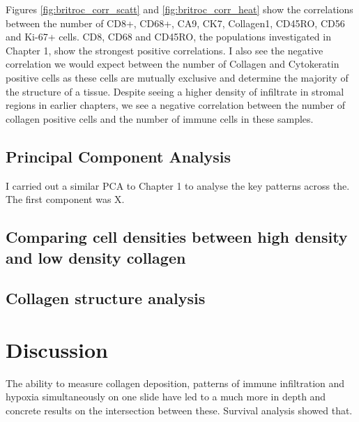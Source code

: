 Figures \ref{fig:britroc_corr_scatt} and \ref{fig:britroc_corr_heat} show the correlations between the number of CD8+, CD68+, CA9, CK7, Collagen1, CD45RO, CD56 and Ki-67+ cells. CD8, CD68 and CD45RO, the populations investigated in Chapter 1, show the strongest positive correlations. I also see the negative correlation we would expect between the number of Collagen and Cytokeratin positive cells as these cells are mutually exclusive and determine the majority of the structure of a tissue. Despite seeing a higher density of infiltrate in stromal regions in earlier chapters, we see a negative correlation between the number of collagen positive cells and the number of immune cells in these samples.

\subsection{Principal Component Analysis}
I carried out a similar PCA to Chapter 1 to analyse the key patterns across the. The first component was X.

\subsection{Comparing cell densities between high density and low density collagen}

\subsection{Collagen structure analysis}

\section{Discussion}
The ability to measure collagen deposition, patterns of immune infiltration and hypoxia simultaneously on one slide have led to a much more in depth and concrete results on the intersection between these.
Survival analysis showed that. 

